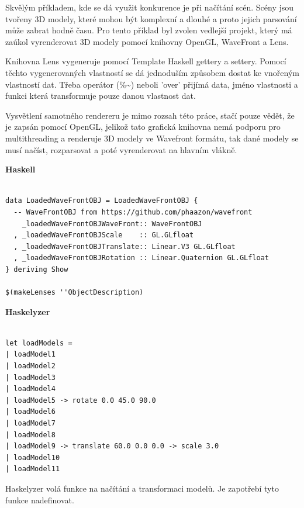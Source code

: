 \documentclass[male,czech]{kithesis}
\begin{document}
Skvělým příkladem, kde se dá využit konkurence je při načítání 
scén. Scény jsou tvořeny 3D modely, které mohou být komplexní a 
dlouhé a proto jejich parsování může zabrat hodně času. Pro 
tento příklad byl zvolen vedlejší projekt, který má zaúkol 
vyrenderovat 3D modely pomocí knihovny OpenGL, WaveFront a Lens. 

Knihovna Lens vygeneruje pomocí Template Haskell gettery a settery.
Pomocí těchto vygenerovaných vlastností se dá jednoduším způsobem 
dostat ke vnořeným vlastností dat. 
Třeba operátor (\%\textasciitilde) neboli 'over' přijímá data,
jméno vlastnosti a 
funkci která transformuje pouze danou vlastnost dat.

Vysvětlení samotného rendereru je mimo rozsah této práce, stačí 
pouze vědět, že je zapsán pomocí OpenGL, jelikož tato grafická 
knihovna nemá podporu pro multithreading a renderuje 
3D modely ve Wavefront formátu, 
tak dané modely se musí načíst,
rozparsovat a 
poté vyrenderovat na hlavním vlákně.

\textbf{Haskell}
\begin{verbatim}

data LoadedWaveFrontOBJ = LoadedWaveFrontOBJ {
  -- WaveFrontOBJ from https://github.com/phaazon/wavefront
    _loadedWaveFrontOBJWaveFront:: WaveFrontOBJ
  , _loadedWaveFrontOBJScale    :: GL.GLfloat
  , _loadedWaveFrontOBJTranslate:: Linear.V3 GL.GLfloat
  , _loadedWaveFrontOBJRotation :: Linear.Quaternion GL.GLfloat
} deriving Show

$(makeLenses ''ObjectDescription)

\end{verbatim}

\textbf{Haskelyzer}
\begin{verbatim}

let loadModels = 
| loadModel1 
| loadModel2 
| loadModel3 
| loadModel4 
| loadModel5 -> rotate 0.0 45.0 90.0
| loadModel6 
| loadModel7 
| loadModel8 
| loadModel9 -> translate 60.0 0.0 0.0 -> scale 3.0
| loadModel10 
| loadModel11 

\end{verbatim}

Haskelyzer volá funkce na načítání a transformaci modelů.
Je zapotřebí tyto funkce nadefinovat.
\end{document}
